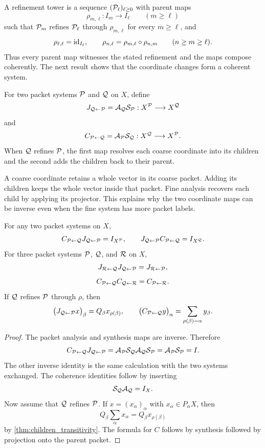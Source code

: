 A refinement tower is a sequence $(\mathcal P_\ell)_{\ell\geq0}$ with parent maps
\[
\rho_{m,\ell}:I_m\longrightarrow I_\ell
\qquad(m\geq\ell)
\]
such that $\mathcal P_m$ refines $\mathcal P_\ell$ through $\rho_{m,\ell}$ for every $m\geq\ell$, and
\[
\rho_{\ell,\ell}=\operatorname{id}_{I_\ell},
\qquad
\rho_{n,\ell}=\rho_{m,\ell}\circ\rho_{n,m}
\qquad(n\geq m\geq\ell).
\]
Thus every parent map witnesses the stated refinement and the maps compose coherently. The next result shows that the coordinate changes form a coherent system.

\begin{definition}\label{def:coordinate_change}\label{def:coordinate-refinement}
For two packet systems $\mathcal P$ and $\mathcal Q$ on $X$, define
\[
J_{\mathcal Q\leftarrow\mathcal P}
=
\mathcal A_{\mathcal Q}\mathcal S_{\mathcal P}:X^{\mathcal P}\longrightarrow X^{\mathcal Q}
\]
and
\[
C_{\mathcal P\leftarrow\mathcal Q}
=
\mathcal A_{\mathcal P}\mathcal S_{\mathcal Q}:X^{\mathcal Q}\longrightarrow X^{\mathcal P}.
\]
When $\mathcal Q$ refines $\mathcal P$, the first map resolves each coarse coordinate into its children and the second adds the children back to their parent.
\end{definition}

\begin{keyidea}
A coarse coordinate retains a whole vector in its coarse packet. Adding its children keeps the whole vector inside that packet. Fine analysis recovers each child by applying its projector. This explains why the two coordinate maps can be inverse even when the fine system has more packet labels.
\end{keyidea}

\begin{theorem}\label{thm:coordinate_coherence}\label{prop:perfect-reconstruction}
For any two packet systems on $X$,
\[
C_{\mathcal P\leftarrow\mathcal Q}J_{\mathcal Q\leftarrow\mathcal P}=I_{X^{\mathcal P}},
\qquad
J_{\mathcal Q\leftarrow\mathcal P}C_{\mathcal P\leftarrow\mathcal Q}=I_{X^{\mathcal Q}}.
\]
For three packet systems $\mathcal P$, $\mathcal Q$, and $\mathcal R$ on $X$,
\[
J_{\mathcal R\leftarrow\mathcal Q}J_{\mathcal Q\leftarrow\mathcal P}
=
J_{\mathcal R\leftarrow\mathcal P},
\]
\[
C_{\mathcal P\leftarrow\mathcal Q}C_{\mathcal Q\leftarrow\mathcal R}
=
C_{\mathcal P\leftarrow\mathcal R}.
\]
If $\mathcal Q$ refines $\mathcal P$ through $\rho$, then
\[
\bigl(J_{\mathcal Q\leftarrow\mathcal P}x\bigr)_\beta
=
Q_\beta x_{\rho(\beta)},
\qquad
\bigl(C_{\mathcal P\leftarrow\mathcal Q}y\bigr)_\alpha
=
\sum_{\rho(\beta)=\alpha}y_\beta.
\]
\end{theorem}

\begin{proof}
The packet analysis and synthesis maps are inverse.  Therefore
\[
C_{\mathcal P\leftarrow\mathcal Q}J_{\mathcal Q\leftarrow\mathcal P}
=
\mathcal A_{\mathcal P}\mathcal S_{\mathcal Q}\mathcal A_{\mathcal Q}\mathcal S_{\mathcal P}
=
\mathcal A_{\mathcal P}\mathcal S_{\mathcal P}
=
I.
\]
The other inverse identity is the same calculation with the two systems exchanged.  The coherence identities follow by inserting
\[
\mathcal S_{\mathcal Q}\mathcal A_{\mathcal Q}=I_X.
\]
Now assume that $\mathcal Q$ refines $\mathcal P$.  If $x=(x_\alpha)_\alpha$ with $x_\alpha\in P_\alpha X$, then
\[
Q_\beta\sum_\alpha x_\alpha
=
Q_\beta x_{\rho(\beta)}
\]
by \cref{thm:children_transitivity}.  The formula for $C$ follows by synthesis followed by projection onto the parent packet.
\end{proof}

